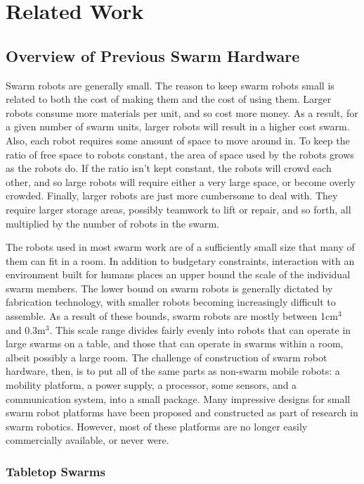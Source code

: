 \documentclass[]{article}
\begin{document}
\section{Related Work}

\subsection{Overview of Previous Swarm Hardware}

Swarm robots are generally small. 
The reason to keep swarm robots small is related to both the cost of making them and the cost of using them. 
Larger robots consume more materials per unit, and so cost more money.
As a result, for a given number of swarm units, larger robots will result in a higher cost swarm. 
Also, each robot requires some amount of space to move around in. 
To keep the ratio of free space to robots constant, the area of space used by the robots grows as the robots do. 
If the ratio isn't kept constant, the robots will crowd each other, and so large robots will require either a very large space, or become overly crowded.
Finally, larger robots are just more cumbersome to deal with. 
They require larger storage areas, possibly teamwork to lift or repair, and so forth, all multiplied by the number of robots in the swarm. 

The robots used in most swarm work are of a sufficiently small size that many of them can fit in a room. In addition to budgetary constraints, interaction with an environment built for humans places an upper bound the scale of the individual swarm members. 
The lower bound on swarm robots is generally dictated by fabrication technology, with smaller robots becoming increasingly difficult to assemble. 
As a result of these bounds, swarm robots are mostly between 1cm$^3$ and 0.3m$^3$. 
This scale range divides fairly evenly into robots that can operate in large swarms on a table, and those that can operate in swarms within a room, albeit possibly a large room. 
The challenge of construction of swarm robot hardware, then, is to put all of the same parts as non-swarm mobile robots: a mobility platform, a power supply, a processor, some sensors, and a communication system, into a small package.
Many impressive designs for small swarm robot platforms have been proposed and constructed as part of research in swarm robotics. 
However, most of these platforms are no longer easily commercially available, or never were. 


\subsubsection{Tabletop Swarms}
\end{document}
